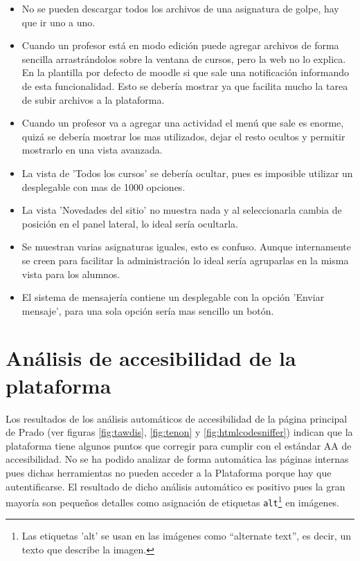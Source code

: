 \begin{itemize}
\item No se pueden descargar todos los archivos de una asignatura de golpe, hay que ir uno a uno.
\item Cuando un profesor está en modo edición puede agregar archivos de forma sencilla arrastrándolos sobre la ventana de cursos, pero la web no lo explica. En la plantilla por defecto de moodle si que sale una notificación informando de esta funcionalidad. Esto se debería mostrar ya que facilita mucho la tarea de subir archivos a la plataforma.
\item Cuando un profesor va a agregar una actividad el menú que sale es enorme, quizá se debería mostrar los mas utilizados, dejar el resto ocultos y permitir mostrarlo en una vista avanzada.
\item La vista de 'Todos los cursos' se debería ocultar, pues es imposible utilizar un desplegable con mas de 1000 opciones.
\item La vista 'Novedades del sitio' no muestra nada y al seleccionarla cambia de posición en el panel lateral, lo ideal sería ocultarla.
\item Se muestran varias asignaturas iguales, esto es confuso. Aunque internamente se creen para facilitar la administración lo ideal sería agruparlas en la misma vista para los alumnos.
\item El sistema de mensajería contiene un desplegable con la opción 'Enviar mensaje', para una sola opción sería mas sencillo un botón.

\end{itemize}

\section{Análisis de accesibilidad de la plataforma}

Los resultados de los análisis automáticos de accesibilidad de la página principal de Prado (ver figuras \ref{fig:tawdis}, \ref{fig:tenon} y \ref{fig:htmlcodesniffer}) indican que la plataforma tiene algunos puntos que corregir para cumplir con el estándar AA de accesibilidad. No se ha podido analizar de forma automática las páginas internas pues dichas herramientas no pueden acceder a la Plataforma porque hay que autentificarse. El resultado de dicho análisis automático es positivo pues la gran mayoría son pequeños detalles como asignación de etiquetas \texttt{alt}\footnote{Las etiquetas 'alt' se usan en las imágenes como “alternate text”, es decir, un texto que describe la imagen.} en imágenes. 

